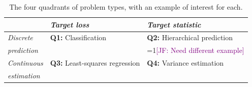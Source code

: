 \documentclass[anon,12pt]{colt2021} %
\newcommand{\Comments}{1}
\newcommand{\mynote}[2]{\ifnum\Comments=1\textcolor{#1}{#2}\fi}
\newcommand{\jessie}[1]{\mynote{purple}{[JF: #1]}}
\begin{document}

\begin{table}
	\begin{center}
	\begin{tabular}{p{12ex}|l|l|} 
		& \emph{Target loss}  & \emph{Target statistic}\\ \hline
		\emph{Discrete} & \textbf{Q1:} Classification  & \textbf{Q2:} Hierarchical prediction\\ 
		{\em prediction} & & \jessie{Need different example}\\ \hline 
		\emph{Continuous } & \textbf{Q3:} Least-squares regression & \textbf{Q4:} Variance estimation\\ 
		\emph{estimation}& & \\
		\hline
	\end{tabular}
\caption{The four quadrants of problem types, with an example of interest for each.}
\label{tab:quadrants}
\end{center}
\end{table}
\end{document}

